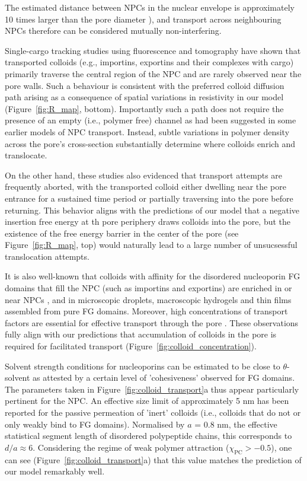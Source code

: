 \documentclass[12pt, a4paper]{article}
\begin{document}
The estimated distance between NPCs in the nuclear envelope is approximately 10 times larger than the pore diameter \cite{Yang2004, Daigle2001, Feldherr1984, Kubitscheck2000}), and transport across neighbouring NPCs therefore can be considered mutually non-interfering. 

Single-cargo tracking studies using fluorescence \cite{Musser2016, Lowe2010, Lowe2015, Yang2004, Kubitscheck2000, Ma2010} and tomography \cite{Beck2007} have shown that transported colloids (e.g., importins, exportins and their complexes with cargo) primarily traverse the central region of the NPC and are rarely observed near the pore walls.
Such a behaviour is consistent with the preferred colloid diffusion path arising as a consequence of spatial variations in resistivity in our model (Figure~\ref{fig:R_map}, bottom).
Importantly such a path does not require the presence of an empty (i.e., polymer free) channel as had been suggested in some earlier models of NPC transport. Instead, subtle variations in polymer density across the pore's cross-section substantially determine where colloids enrich and translocate.  

On the other hand, these studies also evidenced that transport attempts are frequently aborted, with the transported colloid either dwelling near the pore entrance for a sustained time period or partially traversing into the pore before returning.
This behavior aligns with the predictions of our model that a negative insertion free energy at th pore periphery draws colloids into the pore, but the existence of the free energy barrier in the center of the pore (see Figure~\ref{fig:R_map}, top) would naturally lead to a large number of unsucsessful translocation attempts.

It is also well-known that colloids with affinity for the disordered nucleoporin FG domains that fill the NPC (such as importins and exportins) are enriched in or near NPCs \cite{Beck2007, Gruenwald2010, Tu2011}, and in microscopic droplets, macroscopic hydrogels and thin films assembled from pure FG domains.
Moreover, high concentrations of transport factors are essential for effective transport through the pore \cite{Lowe2015}.
These observations fully align with our predictions that accumulation of colloids in the pore is required for facilitated transport (Figure~\ref{fig:colloid_concentration}).

Solvent strength conditions for nucleoporins can be estimated to be close to $\theta$-solvent as attested by a certain level of 'cohesiveness' observed for FG domains. 
The parameters taken in Figure~\ref{fig:colloid_transport}a thus appear particularly pertinent for the NPC.
An effective size limit of approximately 5 nm has been reported for the passive permeation of 'inert' colloids (i.e., colloids that do not or only weakly bind to FG domains).
Normalised by $a$ = 0.8 nm, the effective statistical segment length of disordered polypeptide chains, this corresponds to $d/a\approx 6$. Considering the regime of weak polymer attraction ($\chi_{\text{PC}} > -0.5$), one can see (Figure~\ref{fig:colloid_transport}a) that this value matches the prediction of our model remarkably well.
\end{document}
